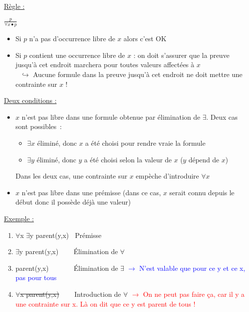 \begin{flushleft}
\underline{R\`egle :}
\begin{center}
{\LARGE $\frac{p}{\forall x \bullet p}$}
\end{center}
\begin{itemize}
\item Si $p$ n'a pas d'occurrence libre de $x$ alors c'est OK
\item Si $p$ contient une occurrence libre de $x$ : on doit s'assurer que la preuve jusqu'à cet endroit marchera pour toutes valeurs affectées à $x$\\
$\> \> \> \hookrightarrow$ Aucune formule dans la preuve jusqu'à cet endroit ne doit mettre une contrainte sur $x$ !
\end{itemize}
\underline{Deux conditions :}
\begin{itemize}
\item $x$ n'est pas libre dans une formule obtenue par élimination de $\exists$. Deux cas sont possibles~:
	\begin{itemize}
		\item $\exists x$ éliminé, donc $x$ a été choisi pour rendre vraie la formule
		\item $\exists y$ éliminé, donc $y$ a été choisi selon la valeur de $x$ ($y$ dépend de $x$)
	\end{itemize}
		Dans les deux cas, une contrainte sur $x$ empèche d'introduire $\forall x$
\item $x$ n'est pas libre dans une prémisse (dans ce cas, $x$ serait connu depuis le début donc il possède déjà une valeur)
\end{itemize}

\underline{Exemple :}\\
\begin{enumerate}
\item $\forall$x $\exists$y parent(y,x) $\>$ Prémisse
\item $\exists$y parent(y,x) $\>$ $\>$ $\>$ $\>$Élimination de $\forall$
\item parent(y,x) $\>$ $\>$ $\>$ $\>$ $\>$ $\>$ Élimination de $\exists$ \textcolor{blue}{$\rightarrow$ N'est valable que pour ce y et ce x, pas pour tous}
\item \sout{$\forall$x parent(y,x)} $\>$ $\>$ $\>$ $\>$Introduction de $\forall$ \textcolor{red}{$\rightarrow$ On ne peut pas faire ça, car il y a une contrainte sur x. Là on dit que ce y est parent de tous !}
\end{enumerate}




\end{flushleft}

